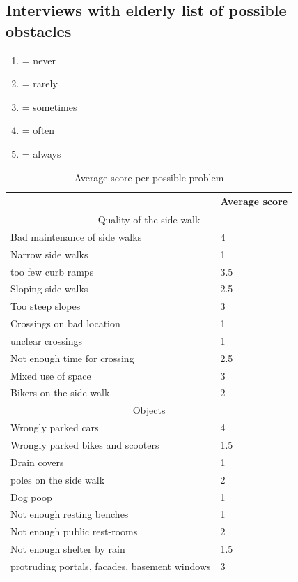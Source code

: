 \begin{appendix}
\clearpage

\section{Interviews with elderly list of possible obstacles}\label{Aelderly}
\begin{enumerate}
	\item = never
	\item = rarely
	\item = sometimes
	\item = often
	\item = always
\end{enumerate}

\begin{table}[ht]
\caption{Average score per possible problem \label{obstacles}}
\begin{tabular}{|l|l|}
	\hline
	 & Average score \\
	\hline
	\multicolumn{2}{|c|}{Quality of the side walk} \\
	\hline
	Bad maintenance of side walks & 4 \\
	Narrow side walks & 1 \\
	too few curb ramps & 3.5 \\
	Sloping side walks & 2.5  \\
	Too steep slopes & 3 \\
	Crossings on bad location & 1 \\
	unclear crossings & 1 \\
	Not enough time for crossing & 2.5 \\
	Mixed use of space & 3 \\
	Bikers on the side walk & 2 \\
	\hline
	\multicolumn{2}{|c|}{Objects} \\
	\hline
	Wrongly parked cars & 4 \\
	Wrongly parked bikes and scooters & 1.5 \\
	Drain covers & 1 \\
	poles on the side walk & 2 \\
	Dog poop & 1 \\
	Not enough resting benches & 1 \\
	Not enough public rest-rooms & 2 \\
	Not enough shelter by rain & 1.5 \\
	protruding portals, facades, basement windows & 3 \\
	\hline

\end{tabular}
\end{table}
\end{appendix}
